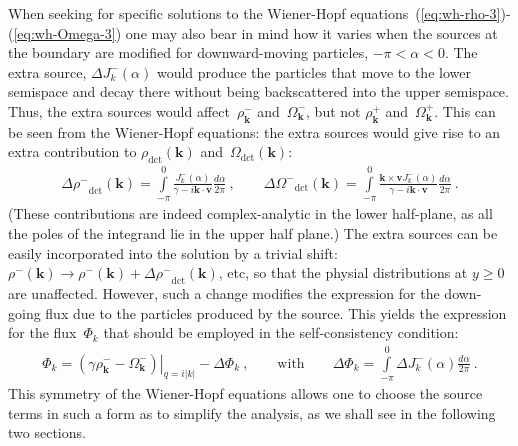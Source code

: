 \documentclass[preprint,aps,eqsecnum, prb]{revtex4-1}
\newcommand{\fplus}[1]{{#1}^{+}}
\newcommand{\fminus}[1]{{#1}^{-}}
\newcommand{\dct}[1]{{#1}_\mathrm{dct}}
\begin{document}
When seeking for specific solutions to the Wiener-Hopf
equations~(\ref{eq:wh-rho-3})-(\ref{eq:wh-Omega-3}) one may also
bear in mind how it varies when the sources at the boundary
are modified for downward-moving particles, $-\pi < \alpha < 0$.
The extra source, $\Delta J^{-}_k(\alpha)$ would produce the particles
that move to the lower semispace and decay there without being
backscattered into the upper semispace. Thus, the extra sources
would affect~$\fminus{\rho}_{\bm k}$ and~$\fminus{\Omega}_{\bm k}$,
but not  $\fplus{\rho}_{\bm k}$ and~$\fplus{\Omega}_{\bm k}$.
This can be seen from the Wiener-Hopf equations: the extra sources
would give rise to an extra contribution to $\dct{\rho}({\bm k})$
and~$\Omega_\mathrm{dct}({\bm k})$:
\begin{align}
\Delta \dct{\fminus{\rho}}({\bm k}) =
\int\limits_{-\pi}^{0} \frac{\fminus{J}_k(\alpha)}{\gamma - i {\bm k}\cdot{\bm v}}
\frac{d\alpha}{2\pi}\ ,
\qquad
\Delta \dct{\fminus{\Omega}}({\bm k}) =
\int\limits_{-\pi}^{0} \frac{{\bm k}\times{\bm v}\fminus{J}_k(\alpha)}{
            \gamma - i {\bm k}\cdot{\bm v}}
\frac{d\alpha}{2\pi}\ .
\end{align}
(These contributions are indeed complex-analytic in the lower half-plane,
as all the poles of the integrand lie in the upper half plane.)
The extra sources can be easily incorporated
into the solution by a trivial  shift: $\fminus{\rho}({\bm k})
\to \fminus{\rho}({\bm k}) + \Delta\dct{\fminus{\rho}}({\bm k})$, etc,
so that the physial distributions at $y \geq 0$ are unaffected.
However, such a change modifies the expression for the down-going flux
due to the particles produced by the source. This yields
the expression for the flux~$\Phi_{k}$ that should be employed
in the self-consistency condition:
\begin{align}
  \label{eq:delta-phi}
\Phi_{k} = \left. \left(\gamma \fminus{\rho}_{\bm k}
-  \fminus{\Omega}_{\bm k} \right)\right|_{q = i |k|} - \Delta\Phi_{k}\ ,
\qquad
\mathrm{with}\qquad
\Delta\Phi_{k} = \int\limits_{-\pi}^{0} \Delta \fminus{J}_{k}(\alpha)
\frac{d\alpha}{2\pi}\ .
\end{align}
This symmetry of the Wiener-Hopf equations allows one to choose the
source terms in such a form as to simplify the analysis, as we shall
see in the following two sections.


\end{document}
